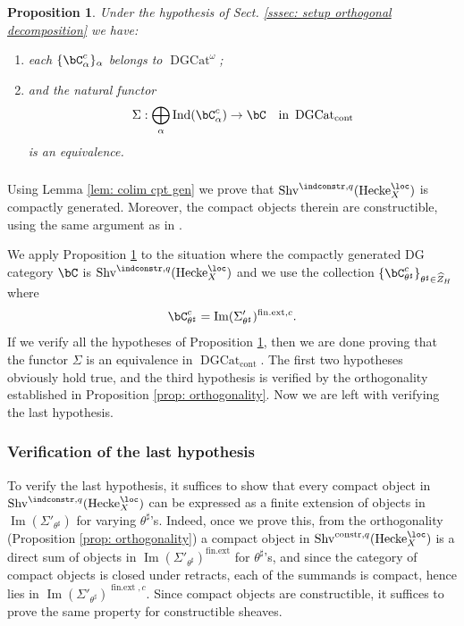 \documentclass[10pt]{amsart}
\newcommand{\sssec}{\subsubsection}
\newtheorem{prop}[subsubsection]{Proposition}
\theoremstyle{remark}
\newcommand{\te}{\text}
\newcommand{\wh}{\widehat}
\newcommand{\on}{\operatorname}
\newcommand{\DGcat}{\on{DGCat}_{\on{cont}}}
\newcommand{\Shv}{\on{Shv}}
\DeclareMathOperator{\Ind}{Ind}
\newcommand{\Hecke}{\on{Hecke}}
\begin{document}
\begin{prop}\label{prop: orth decomp of cpt gen cat}
Under the hypothesis of Sect. \ref{sssec: setup orthogonal decomposition} we have:
    \begin{enumerate}
    \item each $\{\bC^c_{\alpha}\}_{\alpha}$ belongs to $\on{DGCat}^{\omega}$; 
    \item and the natural functor
    \[\Sigma:\bigoplus_{\alpha}\Ind(\bC^c_{\alpha})\rightarrow \bC\quad\te{in }\DGcat\]
    is an equivalence.
\end{enumerate}
\end{prop}


\sssec{}
Using Lemma \ref{lem: colim cpt gen} we prove that $\Shv^{\indconstr,q}(\Hecke^{\loc}_X)$ is compactly generated. 
Moreover, the compact objects therein are constructible, using the same argument as in \cite[Sect. F.2.2]{AGKRRV}.
\medskip

We apply Proposition \ref{prop: orth decomp of cpt gen cat} to the situation where the compactly generated DG category $\bC$ is $\Shv^{\indconstr,q}(\Hecke^{\loc}_X)$ and we use the collection $\{\bC^c_{\theta^{\sharp}}\}_{\theta^{\sharp}\in\wh{Z}_H}$ where
\[\bC^c_{\theta^{\sharp}}=\on{Im}(\Sigma'_{\theta^{\sharp}})^{\on{fin.ext},c}.\]
If we verify all the hypotheses of Proposition \ref{prop: orth decomp of cpt gen cat}, then we are done proving that the functor $\Sigma$ is an equivalence in $\DGcat$. The first two hypotheses obviously hold true, and the third hypothesis is verified by the orthogonality established in Proposition \ref{prop: orthogonality}. Now we are left with verifying the last hypothesis. 

\sssec{Verification of the last hypothesis}
To verify the last hypothesis, it suffices to show that every compact object in $\Shv^{\indconstr,q}(\Hecke^{\loc}_X)$ can be expressed as a finite extension of objects in $\on{Im}(\Sigma'_{\theta^{\sharp}})$ for varying $\theta^{\sharp}$'s. Indeed, once we prove this, from the orthogonality (Proposition \ref{prop: orthogonality}) a compact object in $\Shv^{\on{constr},q}(\Hecke^{\loc}_X)$ is a direct sum of objects in $\on{Im}(\Sigma'_{\theta^{\sharp}})^{\on{fin.ext}}$ for $\theta^{\sharp}$'s, and since the category of compact objects is closed under retracts, each of the summands is compact, hence lies in $\on{Im}(\Sigma'_{\theta^{\sharp}})^{\on{fin.ext},c}$. Since compact objects are constructible, it suffices to prove the same property for constructible sheaves.
\medskip
\end{document}
